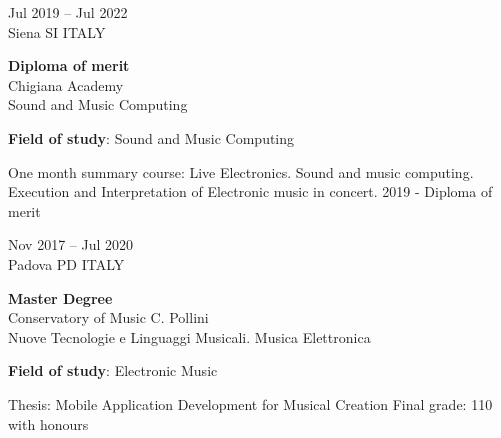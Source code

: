\documentclass[7pt,a4paper]{article}
\begin{document}
\begin{mdframed}[
    backgroundcolor=white,
    linecolor=white,
    linewidth=0pt,
    innerleftmargin=6pt,
    innerrightmargin=6pt,
    innertopmargin=6pt,
    innerbottommargin=6pt,
    skipabove=0pt,
    skipbelow=0pt
]

\begin{minipage}[t]{0.28\textwidth}

Jul 2019 – Jul 2022
\\\scriptsize Siena SI ITALY

\end{minipage}
\begin{minipage}[t]{0.68\textwidth}
\normalsize
\textbf{Diploma of merit}\\
Chigiana Academy
\\ \small Sound and Music Computing
\par \vspace{0.1cm} 

\par \scriptsize \textbf{Field of study}: Sound and Music Computing
 

\scriptsize One month summary course: Live Electronics. Sound and music computing. Execution and Interpretation of Electronic music in concert. 
 2019 - Diploma of merit

\end{minipage}
\vspace{0.25cm}
\end{mdframed}


\begin{mdframed}[
    backgroundcolor=entrygray,
    linecolor=entrygray,
    linewidth=0pt,
    innerleftmargin=6pt,
    innerrightmargin=6pt,
    innertopmargin=6pt,
    innerbottommargin=6pt,
    skipabove=0pt,
    skipbelow=0pt
]

\begin{minipage}[t]{0.28\textwidth}

Nov 2017 – Jul 2020
\\\scriptsize Padova PD ITALY

\end{minipage}
\begin{minipage}[t]{0.68\textwidth}
\normalsize
\textbf{Master Degree}\\
Conservatory of Music C. Pollini
\\ \small Nuove Tecnologie e Linguaggi Musicali. Musica Elettronica
\par \vspace{0.1cm} 

\par \scriptsize \textbf{Field of study}: Electronic Music
 

\scriptsize Thesis: Mobile Application Development for Musical Creation
 Final grade: 110 with honours

\end{minipage}
\vspace{0.25cm}
\end{mdframed}
\end{document}
